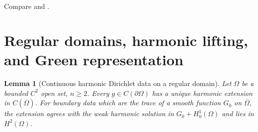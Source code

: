 \documentclass[11pt,oneside,openany]{book}
\theoremstyle{plain}
\newtheorem{lemma}[theorem]{Lemma}
\theoremstyle{definition}
\theoremstyle{remark}
\begin{document}
Compare \cite[Section 2.2.4]{Evans} and
\cite[Sections 2.4--2.5 and 4.2]{GT}.

\section{Regular domains, harmonic lifting, and Green representation}
\label{pde:L07}

\begin{lemma}[Continuous harmonic Dirichlet data on a regular domain]
\label{lem:pde-harmonic-lift}
Let \(\Omega\) be a bounded \(C^2\) open set, \(n\ge2\).
Every \(g\in C(\partial\Omega)\) has a unique harmonic extension
in \(C(\overline\Omega)\). For boundary data which are the trace
of a smooth function \(G_0\) on \(\overline\Omega\), the extension
agrees with the weak harmonic solution in
\(G_0+H^1_0(\Omega)\) and lies in \(H^2(\Omega)\).
\end{lemma}
\end{document}
